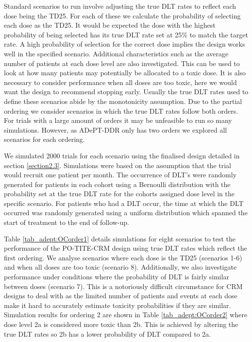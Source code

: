 Standard scenarios to run involve adjusting the true DLT rates to reflect each dose being the TD25. For each of these we calculate the probability of selecting each dose as the TD25. It would be expected the dose with the highest probability of being selected has its true DLT rate set at 25\% to match the target rate. A high probability of selection for the correct dose implies the design works well in the specified scenario. Additional characteristics such as the average number of patients at each dose level are also investigated. This can be used to look at how many patients may potentially be allocated to a toxic dose. It is also necessary to consider performance when all doses are too toxic, here we would want the design to recommend stopping early. Usually the true DLT rates used to define these scenarios abide by the monotonicity assumption. Due to the partial ordering we consider scenarios in which the true DLT rates follow both orders. For trials with a large amount of orders it may be unfeasible to run so many simulations. However, as ADePT-DDR only has two orders we explored all scenarios for each ordering.

We simulated 2000 trials for each scenario using the finalised design detailed in section \ref{section2.3}. Simulations were based on the assumption that the trial would recruit one patient per month. The occurrence of DLT's were randomly generated for patients in each cohort using a Bernoulli distribution with the probability set at the true DLT rate for the cohorts assigned dose level in the specific scenario. For patients who had a DLT occur, the time at which the DLT occurred was randomly generated using a uniform distribution which spanned the start of treatment to the end of follow-up.  

Table \ref{tab_adept:OCorder1} details simulations for eight scenarios to test the performance of the PO-TITE-CRM design using true DLT rates which reflect the first ordering. We analyse scenarios where each dose is the TD25 (scenarios 1-6) and when all doses are too toxic (scenario 8). Additionally, we also investigate performance under conditions where the probability of DLT is fairly similar between doses (scenario 7). This is a notoriously difficult circumstance for CRM designs to deal with as the limited number of patients and events at each dose make it hard to accurately estimate toxicity probabilities if they are similar. Simulation results for ordering 2 are shown in Table \ref{tab_adept:OCorder2} where dose level 2a is considered more toxic than 2b. This is achieved by altering the true DLT rates so 2b has a lower probability of DLT compared to 2a. 

